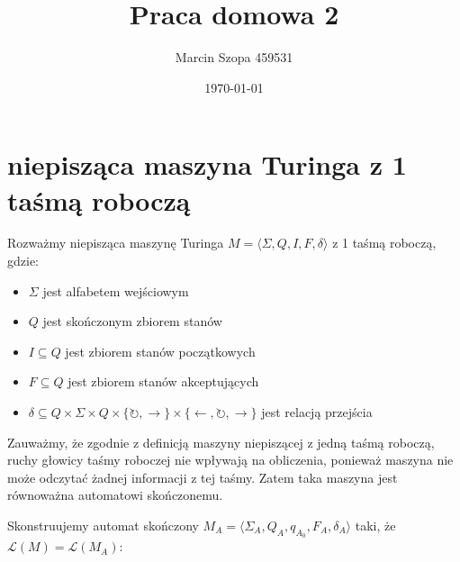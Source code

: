 \documentclass{article}
\title{Praca domowa 2}
\author{Marcin Szopa 459531}
\date{\today}
\theoremstyle{definition}
\theoremstyle{remark}
\begin{document}
\maketitle

\section{niepisząca maszyna Turinga z 1 taśmą roboczą}

Rozważmy niepisząca maszynę Turinga $M = \langle \Sigma, Q, I, F, \delta \rangle$ z 1 taśmą roboczą, gdzie:
\begin{itemize}
\item $\Sigma$ jest alfabetem wejściowym
\item $Q$ jest skończonym zbiorem stanów
\item $I \subseteq Q$ jest zbiorem stanów początkowych
\item $F \subseteq Q$ jest zbiorem stanów akceptujących
\item $\delta \subseteq Q \times \Sigma \times Q \times \{\circlearrowright, \rightarrow\} \times \{\leftarrow, \circlearrowright, \rightarrow\}$ jest relacją przejścia
\end{itemize}

Zauważmy, że zgodnie z definicją maszyny niepiszącej z jedną taśmą roboczą, ruchy głowicy taśmy roboczej nie wpływają na obliczenia, ponieważ maszyna nie może odczytać żadnej informacji z tej taśmy. Zatem taka maszyna jest równoważna automatowi skończonemu.

Skonstruujemy automat skończony $M_A = \langle \Sigma_A, Q_A, q_{A_0}, F_A, \delta_A \rangle$ taki, że $\mathcal{L}(M) = \mathcal{L}(M_A)$:
\end{document}
